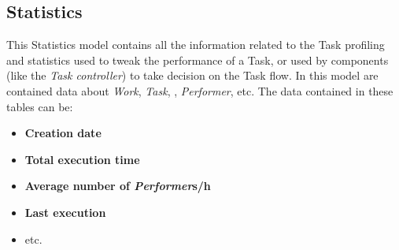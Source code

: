 \subsection{Statistics}
This Statistics model contains all the information related to the Task profiling
and statistics used to tweak the performance of a Task, or used by components
(like the \emph{Task controller}) to take decision on the Task flow. In this
model are contained data about \emph{Work}, \emph{Task}, \emph{\utask{}},
\emph{Performer}, etc. The data contained in these tables can be:
\begin{itemize}
    \item \textbf{Creation date}
    \item \textbf{Total execution time}
    \item \textbf{Average number of \emph{Performer}s/h}
    \item \textbf{Last execution}
    \item etc.
\end{itemize}
